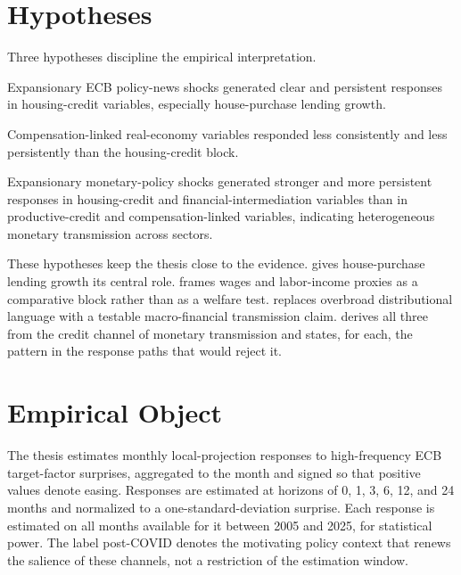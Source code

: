 \clearpage
\section{Hypotheses}

Three hypotheses discipline the empirical interpretation.

\begin{hypothesis}
\label{hyp:housing-credit-persistence}
Expansionary ECB policy-news shocks generated clear and persistent responses in housing-credit variables, especially house-purchase lending growth.
\end{hypothesis}

\begin{hypothesis}
\label{hyp:compensation-linked-attenuation}
Compensation-linked real-economy variables responded less consistently and less persistently than the housing-credit block.
\end{hypothesis}

\begin{hypothesis}
\label{hyp:differential-financial-intermediation}
Expansionary monetary-policy shocks generated stronger and more persistent responses in housing-credit and financial-intermediation variables than in productive-credit and compensation-linked variables, indicating heterogeneous monetary transmission across sectors.
\end{hypothesis}

These hypotheses keep the thesis close to the evidence.  gives house-purchase lending growth its central role.  frames wages and labor-income proxies as a comparative block rather than as a welfare test.  replaces overbroad distributional language with a testable macro-financial transmission claim.  derives all three from the credit channel of monetary transmission and states, for each, the pattern in the response paths that would reject it.

\section{Empirical Object}

The thesis estimates monthly local-projection responses to high-frequency ECB target-factor surprises, aggregated to the month and signed so that positive values denote easing. Responses are estimated at horizons of 0, 1, 3, 6, 12, and 24 months and normalized to a one-standard-deviation surprise. Each response is estimated on all months available for it between 2005 and 2025, for statistical power. The label post-COVID denotes the motivating policy context that renews the salience of these channels, not a restriction of the estimation window.

